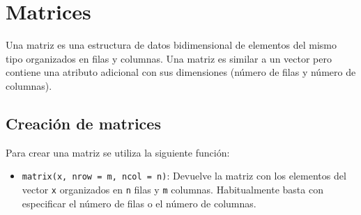 \documentclass[
  a4paper,
]{scrreport}
\providecommand{\tightlist}{%
  \setlength{\itemsep}{0pt}\setlength{\parskip}{0pt}}\usepackage{longtable,booktabs,array}
\theoremstyle{definition}
\theoremstyle{definition}
\theoremstyle{remark}
\begin{document}
\section{Matrices}\label{matrices}

Una matriz es una estructura de datos bidimensional de elementos del
mismo tipo organizados en filas y columnas. Una matriz es similar a un
vector pero contiene una atributo adicional con sus dimensiones (número
de filas y número de columnas).

\subsection{Creación de matrices}\label{creaciuxf3n-de-matrices}

Para crear una matriz se utiliza la siguiente función:

\begin{itemize}
\tightlist
\item
  \texttt{matrix(x,\ nrow\ =\ m,\ ncol\ =\ n)}: Devuelve la matriz con
  los elementos del vector \texttt{x} organizados en \texttt{n} filas y
  \texttt{m} columnas. Habitualmente basta con especificar el número de
  filas o el número de columnas.
\end{itemize}
\end{document}
